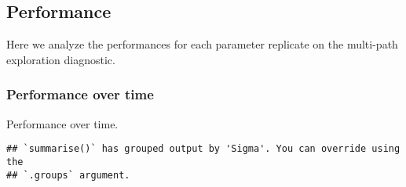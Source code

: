 \documentclass[]{book}
\newenvironment{Shaded}{\begin{snugshade}}{\end{snugshade}}
\newcommand{\DataTypeTok}[1]{\textcolor[rgb]{0.13,0.29,0.53}{#1}}
\newcommand{\KeywordTok}[1]{\textcolor[rgb]{0.13,0.29,0.53}{\textbf{#1}}}
\newcommand{\NormalTok}[1]{#1}
\newcommand{\OperatorTok}[1]{\textcolor[rgb]{0.81,0.36,0.00}{\textbf{#1}}}
\newcommand{\StringTok}[1]{\textcolor[rgb]{0.31,0.60,0.02}{#1}}
\begin{document}
\hypertarget{performance-10}{%
\subsection{Performance}\label{performance-10}}

Here we analyze the performances for each parameter replicate on the multi-path exploration diagnostic.

\hypertarget{performance-over-time-20}{%
\subsubsection{Performance over time}\label{performance-over-time-20}}

Performance over time.

\begin{Shaded}
\end{Shaded}

\begin{verbatim}
## `summarise()` has grouped output by 'Sigma'. You can override using the
## `.groups` argument.
\end{verbatim}
\end{document}
